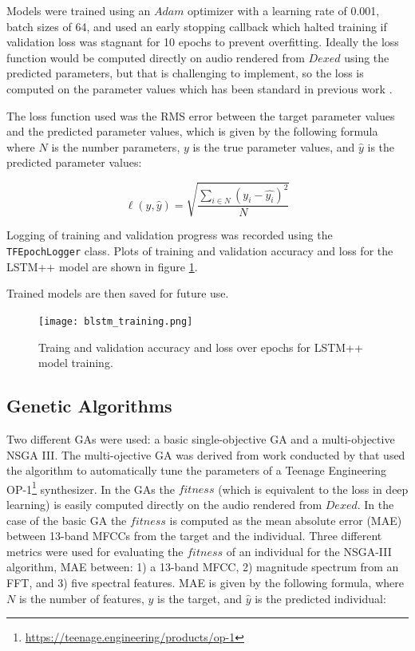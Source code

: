 Models were trained using an $Adam$ optimizer \cite{kingma2014adam} with a learning rate of 0.001, batch sizes of 64, and used an early stopping callback which halted training if validation loss was stagnant for 10 epochs to prevent overfitting. Ideally the loss function would be computed directly on audio rendered from $Dexed$ using the predicted parameters, but that is challenging to implement, so the loss is computed on the parameter values which has been standard in previous work \cite{yee2018automatic, barkan2019inversynth}.

The loss function used was the RMS error between the target parameter values and the predicted parameter values, which is given by the following formula where $N$ is the number parameters, $y$ is the true parameter values, and $\hat{y}$ is the predicted parameter values:

\begin{equation}
    \ell(y, \hat{y}) = \sqrt{\frac{\sum_{i \in N}{(y_i - \hat{y_i})^2}}{N}} 
\end{equation}

Logging of training and validation progress was recorded using the \texttt{TFEpochLogger} class. Plots of training and validation accuracy and loss for the LSTM++ model are shown in figure \ref{fig:lstm_bi_train}. 


Trained models are then saved for future use.

\begin{figure}[ht]
\begin{center}
\texttt{[image: blstm\_training.png]}
\caption{Traing and validation accuracy and loss over epochs for LSTM++ model training.}
\label{fig:lstm_bi_train}
\end{center}
\end{figure}

\subsection{Genetic Algorithms}
Two different GAs were used: a basic single-objective GA and a multi-objective NSGA III. The multi-ojective GA was derived from work conducted by \cite{macret2012automatic} that used the algorithm to automatically tune the parameters of a Teenage Engineering OP-1\footnote{\url{https://teenage.engineering/products/op-1}} synthesizer. In the GAs the $fitness$ (which is equivalent to the loss in deep learning) is easily computed directly on the audio rendered from $Dexed$. In the case of the basic GA the $fitness$ is computed as the mean absolute error (MAE) between 13-band MFCCs from the target and the individual. Three different metrics were used for evaluating the $fitness$ of an individual for the NSGA-III algorithm, MAE between: 1) a 13-band MFCC, 2) magnitude spectrum from an FFT, and 3) five spectral features. MAE is given by the following formula, where $N$ is the number of features, $y$ is the target, and $\hat{y}$ is the predicted individual:

